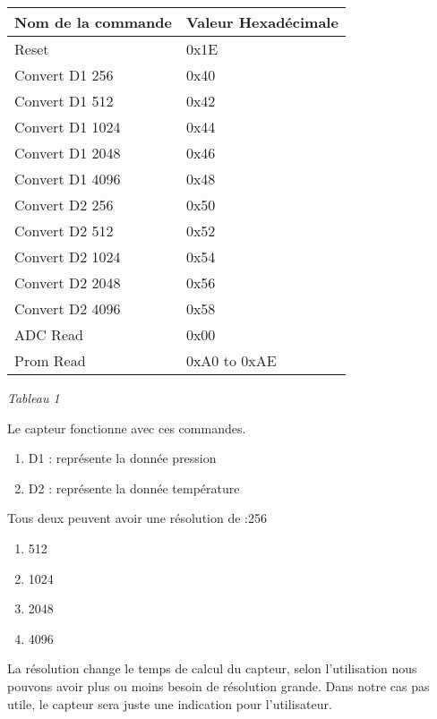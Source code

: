 \begin{tabular}{|p{2.1in}|p{1.8in}|} \hline 
Nom de la commande & Valeur Hexad\'{e}cimale \\ \hline 
Reset & 0x1E \\ \hline 
Convert D1 256 & 0x40 \\ \hline 
Convert D1 512 & 0x42 \\ \hline 
Convert D1 1024 & 0x44 \\ \hline 
Convert D1 2048 & 0x46 \\ \hline 
Convert D1 4096 & 0x48 \\ \hline 
Convert D2 256 & 0x50 \\ \hline 
Convert D2 512 & 0x52 \\ \hline 
Convert D2 1024 & 0x54 \\ \hline 
Convert D2 2048 & 0x56 \\ \hline 
Convert D2 4096 & 0x58 \\ \hline 
ADC Read & 0x00 \\ \hline 
Prom Read & 0xA0 to 0xAE \\ \hline 
\end{tabular}

\textit{Tableau 1}

\noindent \eject 

\noindent Le capteur fonctionne avec ces commandes.

\begin{enumerate}
\item  D1 : repr\'{e}sente la donn\'{e}e pression

\item  D2 : repr\'{e}sente la donn\'{e}e temp\'{e}rature
\end{enumerate}

\noindent Tous deux peuvent avoir une r\'{e}solution de :256

\begin{enumerate}
\item  512

\item  1024

\item  2048

\item  4096
\end{enumerate}

\noindent La r\'{e}solution change le temps de calcul du capteur, selon l'utilisation nous pouvons avoir plus ou moins besoin de r\'{e}solution grande. Dans notre cas pas utile, le capteur sera juste une indication pour l'utilisateur.

